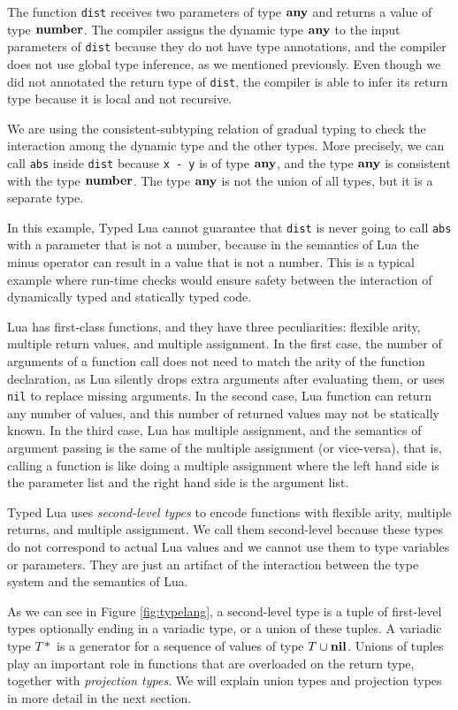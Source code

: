 The function \texttt{dist} receives two parameters of type $\mathbf{any}$
and returns a value of type $\mathbf{number}$.
The compiler assigns the dynamic type $\mathbf{any}$ to the input
parameters of \texttt{dist} because they do not have type annotations,
and the compiler does not use global type inference, as we mentioned
previously.
Even though we did not annotated the return type of \texttt{dist},
the compiler is able to infer its return type because it is local
and not recursive.

We are using the consistent-subtyping relation of gradual
typing to check the interaction among the dynamic type and the other
types.
More precisely, we can call \texttt{abs} inside \texttt{dist} because
\texttt{x - y} is of type $\mathbf{any}$, and the type $\mathbf{any}$ is
consistent with the type $\mathbf{number}$.
The type $\mathbf{any}$ is not the union of all types, but it is a separate
type.

In this example, Typed Lua cannot guarantee that \texttt{dist} is never
going to call \texttt{abs} with a parameter that is not a number,
because in the semantics of Lua the minus operator can result in a
value that is not a number.
This is a typical example where run-time checks would ensure safety
between the interaction of dynamically typed and statically typed code.

Lua has first-class functions, and they have three peculiarities:
flexible arity, multiple return values, and multiple assignment.
In the first case, the number of arguments of a function call does
not need to match the arity of the function declaration, as Lua silently
drops extra arguments after evaluating them, or uses \texttt{nil} to
replace missing arguments.
In the second case, Lua function can return any number of values,
and this number of returned values may not be statically known.
In the third case, Lua has multiple assignment, and the semantics
of argument passing is the same of the multiple assignment
(or vice-versa), that is, calling a function is like doing a
multiple assignment where the left hand side is the parameter list
and the right hand side is the argument list.

Typed Lua uses \emph{second-level types} to encode functions with
flexible arity, multiple returns, and multiple assignment.
We call them second-level because these types do not correspond
to actual Lua values and we cannot use them to type variables or
parameters.
They are just an artifact of the interaction between the type system
and the semantics of Lua.

As we can see in Figure \ref{fig:typelang}, a second-level type is
a tuple of first-level types optionally ending in a variadic type,
or a union of these tuples.
A variadic type $T{*}$ is a generator for a sequence of values of
type $T \cup \mathbf{nil}$.
Unions of tuples play an important role in functions that are
overloaded on the return type, together with \emph{projection types}.
We will explain union types and projection types in more detail
in the next section.

